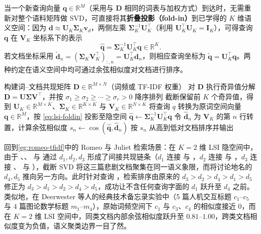 当一个新查询向量 $\mathbf{q}\in\mathbb{R}^M$（采用与 $\mathbf{D}$ 相同的词表与加权方式）到达时，无需重新对整个语料矩阵做 SVD，可直接将其\textbf{折叠投影（fold-in）}到已学得的 $K$ 维语义空间：因为 $\mathbf{d}\approx \mathbf{U}_K\boldsymbol{\Sigma}_K\mathbf{v}_d$，两侧左乘 $\boldsymbol{\Sigma}_K^{-1}\mathbf{U}_K^\top$（利用 $\mathbf{U}_K^\top\mathbf{U}_K=\mathbf{I}_K$），可得查询 $\mathbf{q}$ 在 $\mathbf{V}_K$ 坐标系下的表示
\begin{equation}\label{eq:lsi-foldin}
\hat{\mathbf{q}} = \boldsymbol{\Sigma}_K^{-1}\mathbf{U}_K^\top \mathbf{q} \in \mathbb{R}^{K}.
\end{equation}
若文档坐标采用 $\tilde{\mathbf{d}}_n = (\boldsymbol{\Sigma}_K\mathbf{V}_K^\top)_{:,n} = \mathbf{U}_K^\top \mathbf{d}_n$，则相应查询坐标为 $\tilde{\mathbf{q}} = \mathbf{U}_K^\top \mathbf{q}$。两种约定在语义空间中均可通过余弦相似度对文档进行排序。

\begin{algorithm}\label{alg:lsi}
  \begin{algsteps}
    \State 构建词--文档共现矩阵 $\mathbf{D}\in\mathbb{R}^{M\times N}$（词频或 TF-IDF 权重）
    \State 对 $\mathbf{D}$ 执行奇异值分解 $\mathbf{D}=\mathbf{U}\boldsymbol{\Sigma}\mathbf{V}^\top$，并按 $\sigma_1\ge\sigma_2\ge\cdots\ge\sigma_r>0$ 降序排列
    \State 截断保留前 $K$ 个奇异值，得到 $\mathbf{U}_K\in\mathbb{R}^{M\times K}$、$\boldsymbol{\Sigma}_K\in\mathbb{R}^{K\times K}$ 与 $\mathbf{V}_K\in\mathbb{R}^{N\times K}$
    \State 将查询 $q$ 转换为原词空间向量 $\mathbf{q}\in\mathbb{R}^M$，按 \cref{eq:lsi-foldin} 投影至隐空间 $\hat{\mathbf{q}} \gets \boldsymbol{\Sigma}_K^{-1}\mathbf{U}_K^\top \mathbf{q}$
      \State 令 $\hat{\mathbf{d}}_n$ 为 $\mathbf{V}_K$ 的第 $n$ 行转置，计算余弦相似度 $s_n \gets \cos(\hat{\mathbf{q}}, \hat{\mathbf{d}}_n)$
    \EndFor
    \State 按 $s_n$ 从高到低对文档排序并输出
  \end{algsteps}
\end{algorithm}

回到\cref{eg:romeo-tfidf}中的 Romeo 与 Juliet 检索场景：在 $K=2$ 维 LSI 隐空间中，由于 、、 与  通过 $d_1,d_2,d_3$ 形成了间接共现链条（$d_1$ 连接  与 ，$d_2$ 连接  与 ，$d_3$ 连接 、 与 ），截断 SVD 将这三篇悲剧文档聚集在同一语义象限，而将讨论地名的 $d_4,d_5$ 推向另一方向。此时针对查询 ，检索排序由原来的 $d_3>d_2>d_4>d_1>d_5$ 修正为 $d_3>d_1>d_2>d_4>d_5$，成功让不含任何查询字面的 $d_1$ 跃升至 $d_4$ 之前。类似地，在 Deerwester 等人的经典技术备忘录实验中（5 篇人机交互标题 $c_1\text{--}c_5$ 与 4 篇图论数学标题 $m_1\text{--}m_4$），原始词频空间下 $c_1$ 与 $c_3$、$c_4$ 的相似度接近 $0$，而在 $K=2$ 维 LSI 空间中，同类文档内部余弦相似度跃升至 $0.81\text{--}1.00$，跨类文档相似度变为负值，语义聚类边界一目了然。

